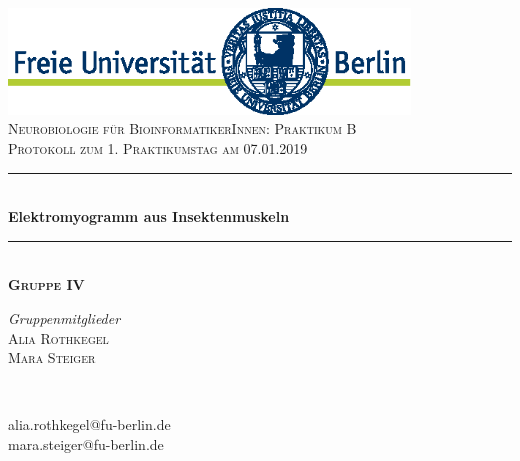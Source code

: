 \begin{titlepage} %
	\newcommand{\HRule}{\rule{\linewidth}{0.5mm}} %
	
	\center %
	
	
\includegraphics[width=0.8\textwidth]{../tex/fu_logo}\\[1cm] 

	
	\textsc{\Large Neurobiologie für BioinformatikerInnen: Praktikum B}\\[0.5cm] %
	
	\textsc{\large Protokoll zum 1. Praktikumstag am 07.01.2019}\\[0.5cm] %

	
	\HRule\\[0.5cm]
	
	{\huge\bfseries Elektromyogramm aus Insektenmuskeln}\\[0.3cm] %
	
	\HRule\\[0.5cm]
	\textsc{\Large\bfseries Gruppe IV}
	\\[0.8cm]
	
\vfill
	
	\begin{minipage}{0.45\textwidth}
		\begin{flushleft}
			\large
			\textit{Gruppenmitglieder}\\
			\textsc{Alia Rothkegel}\\
			\textsc{Mara Steiger}
		\end{flushleft}
	\end{minipage}
	~
	\begin{minipage}{0.45\textwidth}
		\begin{flushright}
			\large \vspace{16pt}
			alia.rothkegel@fu-berlin.de\\
			mara.steiger@fu-berlin.de 
		\end{flushright}
	\end{minipage}
	

\end{titlepage}
